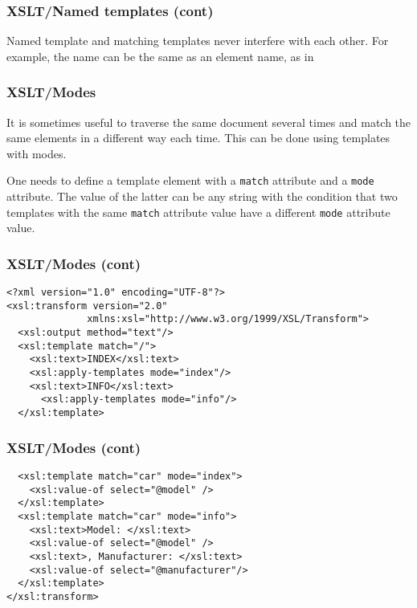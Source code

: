 %
\begin{frame}
\frametitle{XSLT/Named templates (cont)}
  
Named template and matching templates never interfere with each
other. For example, the name can be the same as an element name, as
in

\end{frame}

%
\begin{frame}
\frametitle{XSLT/Modes}
 
It is sometimes useful to traverse the same document several times and
match the same elements in a different way each time. This can be done
using templates with modes.

\bigskip

One needs to define a template element with a \texttt{match} attribute
and a \texttt{mode} attribute. The value of the latter can be any
string with the condition that two templates with the same
\texttt{match} attribute value have a different \texttt{mode}
attribute value.

\end{frame}

%
\begin{frame}[containsverbatim]
\frametitle{XSLT/Modes (cont)}

{\small
\begin{verbatim}
<?xml version="1.0" encoding="UTF-8"?>
<xsl:transform version="2.0"
              xmlns:xsl="http://www.w3.org/1999/XSL/Transform">
  <xsl:output method="text"/>
  <xsl:template match="/">
    <xsl:text>INDEX</xsl:text>
    <xsl:apply-templates mode="index"/>
    <xsl:text>INFO</xsl:text>
      <xsl:apply-templates mode="info"/>
  </xsl:template>
\end{verbatim}
} 

\end{frame}

%
\begin{frame}[containsverbatim]
\frametitle{XSLT/Modes (cont)}

{\small
\begin{verbatim}
  <xsl:template match="car" mode="index">
    <xsl:value-of select="@model" />
  </xsl:template>
  <xsl:template match="car" mode="info">
    <xsl:text>Model: </xsl:text>
    <xsl:value-of select="@model" />
    <xsl:text>, Manufacturer: </xsl:text>
    <xsl:value-of select="@manufacturer"/>
  </xsl:template>
</xsl:transform>
\end{verbatim}
}

\end{frame}

